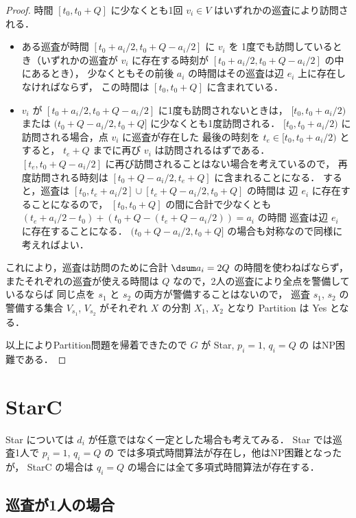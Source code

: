 \begin{proof}
時間 $[t_0, t_0 + Q]$ に少なくとも1回 $v_i \in V$ はいずれかの巡査により訪問される．
\begin{itemize}
	\item
	ある巡査が時間 $[t_0 + a_i/2, t_0 + Q - a_i/2]$ に $v_i$ を
	1度でも訪問しているとき（いずれかの巡査が $v_i$ に存在する時刻が
	$[t_0 + a_i/2, t_0 + Q - a_i/2]$ の中にあるとき），
	少なくともその前後 $a_i$ の時間はその巡査は辺 $e_i$ 上に存在しなければならず，
	この時間は $[t_0, t_0 + Q]$ に含まれている．
	\item 
	$v_i$ が $[t_0 + a_i/2, t_0 + Q - a_i/2]$ に1度も訪問されないときは，
	$[t_0, t_0 + a_i/2)$ または $(t_0 + Q - a_i/2, t_0 + Q]$ に少なくとも1度訪問される．
	$[t_0, t_0 + a_i/2)$ に訪問される場合，点 $v_i$ に巡査が存在した
	最後の時刻を $t_e \in [t_0, t_0 + a_i/2)$ とすると，
	$t_e + Q$ までに再び $v_i$ は訪問されるはずである．
	$[t_e, t_0 + Q - a_i/2]$ に再び訪問されることはない場合を考えているので，
	再度訪問される時刻は $[t_0 + Q - a_i/2, t_e + Q]$ に含まれることになる．
	すると，巡査は $[t_0, t_e + a_i/2] \cup [t_e + Q - a_i/2, t_0 + Q]$ の時間は
	辺 $e_i$ に存在することになるので，
	$[t_0, t_0 + Q]$ の間に合計で少なくとも
	$(t_e + a_i/2 - t_0) + (t_0 + Q - (t_e + Q - a_i/2)) = a_i$ の時間
	巡査は辺 $e_i$ に存在することになる．
	$(t_0 + Q - a_i/2, t_0 + Q]$ の場合も対称なので同様に考えればよい．
\end{itemize}
これにより，巡査は訪問のために合計 $\dsum a_i = 2Q$ の時間を使わねばならず，
またそれぞれの巡査が使える時間は $Q$ なので，2人の巡査により全点を警備しているならば
同じ点を $s_1$ と $s_2$ の両方が警備することはないので，
巡査 $s_1$, $s_2$ の警備する集合 $V_{s_1}$, $V_{s_2}$ 
がそれぞれ $X$ の分割 $X_1$, $X_2$ となり Partition は Yes となる．

以上によりPartition問題を帰着できたので
$G$ が Star, $p_i = 1$, $q_i = Q$ の \minpatroller はNP困難である．
\end{proof}






\section{StarC}

Star については $d_i$ が任意ではなく一定とした場合も考えてみる．
Star では巡査1人で $p_i = 1$, $q_i = Q$ の \maxprofit
では多項式時間算法が存在し，他はNP困難となったが，
StarC の場合は $q_i = Q$ の場合には全て多項式時間算法が存在する．


\subsection{巡査が1人の場合}

